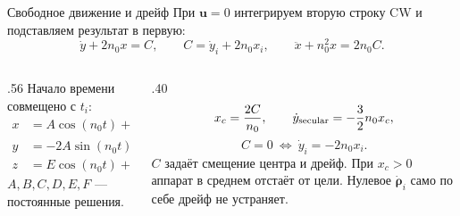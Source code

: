 \documentclass[11pt,aspectratio=169,t]{beamer}
\newcommand{\eqcompact}{\fontsize{10}{12}\selectfont}
\newcommand{\derivationmathspacing}{%
  \setlength{\abovedisplayskip}{2pt}%
  \setlength{\belowdisplayskip}{3pt}%
  \setlength{\abovedisplayshortskip}{2pt}%
  \setlength{\belowdisplayshortskip}{2pt}%
  \setlength{\jot}{2pt}}
\newcommand{\vect}[1]{\boldsymbol{#1}}
\begin{document}
\begin{frame}{Свободное движение и дрейф}
\relax
\derivationmathspacing
При $\vect u=0$ интегрируем вторую строку CW и подставляем результат в первую:
{\eqcompact\derivationmathspacing
\[
 \dot y+2n_0x=C,\qquad C=\dot y_i+2n_0x_i,
 \qquad \boxed{\ddot x+n_0^2x=2n_0C.}
\]
}
\begin{columns}[T,onlytextwidth]
\begin{column}{.56\textwidth}
Начало времени совмещено с $t_i$:
{\eqcompact\derivationmathspacing
\[
\begin{aligned}
 x&=A\cos(n_0t)+B\sin(n_0t)+\frac{2C}{n_0},\\[4pt]
 y&=-2A\sin(n_0t)+2B\cos(n_0t)-3Ct+D,\\[4pt]
 z&=E\cos(n_0t)+F\sin(n_0t).
\end{aligned}
\]
}
$A,B,C,D,E,F$ --- постоянные решения.
\end{column}
\begin{column}{.40\textwidth}
{\eqcompact\derivationmathspacing
\[
 x_c=\frac{2C}{n_0},\qquad
 \dot y_{\rm secular}=-\frac32n_0x_c,
\]
\[
 C=0\ \Longleftrightarrow\ \dot y_i=-2n_0x_i.
\]
}
\justifying
$C$ задаёт смещение центра и дрейф. При $x_c>0$ аппарат в среднем отстаёт от цели.
Нулевое $\dot{\vect\rho}_i$ само по себе дрейф не устраняет.
\end{column}
\end{columns}
\end{frame}
\end{document}

